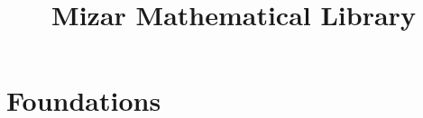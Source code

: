 \documentclass[leqno,oneside]{amsbook} %
\title{Mizar Mathematical Library}
\begin{document}
\maketitle
\tableofcontents
\mainmatter

\chapter{Foundations}


\end{document}
